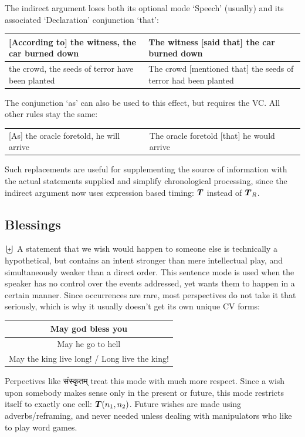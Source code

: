 The indirect argument loses both its optional mode `Speech' (usually) and its associated `Declaration' conjunction `that':
\begin{example}
    \begin{tabular}{m{7cm}|m{6.5cm}}
        [According to] the witness, the car burned down & The witness [said that] the car burned down\\\hline
        [According to] the crowd, the seeds of terror have been planted & The crowd [mentioned that] the seeds of terror had been planted
    \end{tabular}
\end{example}
The conjunction `as' can also be used to this effect, but requires the VC. All other rules stay the same:
\begin{example}
    \begin{tabular}{m{7cm}|m{7cm}}
        [As] the oracle foretold, he will arrive & The oracle foretold [that] he would arrive
    \end{tabular}
\end{example}
Such replacements are useful for supplementing the source of information with the actual statements supplied and simplify chronological processing, since the indirect argument now uses expression based timing: $\boldsymbol{T}$ instead of  $\boldsymbol{T}_R$.
\subsection{Blessings}
$\biguplus$ A statement that we wish would happen to someone else is  technically a hypothetical, but contains an  intent stronger than  mere intellectual play, and simultaneously weaker than a direct order. This sentence mode is used when the speaker has no control over the events addressed, yet wants them to happen in a certain manner. Since occurrences are rare,  most perspectives do not take it that seriously, which is why it usually doesn't get its own unique CV forms:
\begin{example}
    \begin{tabular}{c}
        May god bless you\\\hline May he go to hell\\\hline May the king live long! / Long live the king!
    \end{tabular}
\end{example}
Perpectives like \textsanskrit{संस्कृतम्} treat this mode with much more respect. Since a wish upon somebody makes sense only in the present or future, this mode restricts itself to exactly one cell: $\boldsymbol{T}(n_1,n_2)$. Future wishes are made using adverbs/reframing, and never needed unless dealing with manipulators who like to play word games.
